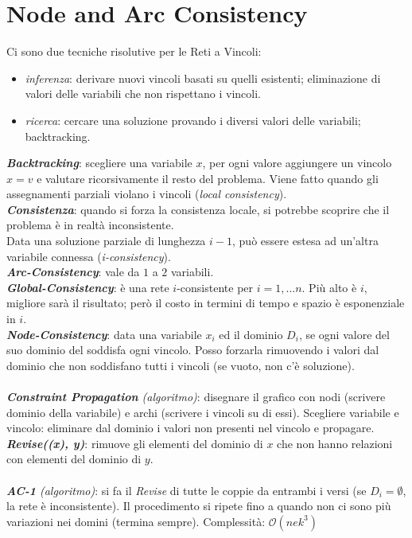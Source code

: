 \documentclass[a4paper, notitlepage, 9pt]{extreport}
\begin{document}
\chapter*{Node and Arc Consistency}
Ci sono due tecniche risolutive per le Reti a Vincoli:
\begin{itemize}
	\item \textit{inferenza}: derivare nuovi vincoli basati su quelli esistenti; eliminazione di valori delle variabili che non rispettano i vincoli.
	\item \textit{ricerca}: cercare una soluzione provando i diversi valori delle variabili; backtracking.
\end{itemize}
\textit{\textbf{Backtracking}}: scegliere una variabile $x$, per ogni valore aggiungere un vincolo $x=v$ e valutare ricorsivamente il resto del problema. Viene fatto quando gli assegnamenti parziali violano i vincoli (\textit{local consistency}).\\
\textit{\textbf{Consistenza}}: quando si forza la consistenza locale, si potrebbe scoprire che il problema è in realtà inconsistente.\\
Data una soluzione parziale di lunghezza $i-1$, può essere estesa ad un'altra variabile connessa (\textit{i-consistency}).\\
\textit{\textbf{Arc-Consistency}}: vale da $1$ a $2$ variabili.\\
\textit{\textbf{Global-Consistency}}: è una rete $i$-consistente per $i=1, \dots n$. Più alto è $i$, migliore sarà il risultato; però il costo in termini di tempo e spazio è esponenziale in $i$.\\
\textit{\textbf{Node-Consistency}}: data una variabile $x_i$ ed il dominio $D_i$, se ogni valore del suo dominio del soddisfa ogni vincolo. Posso forzarla rimuovendo i valori dal dominio che non soddisfano tutti i vincoli (se vuoto, non c'è soluzione).\\\\
\textit{\textbf{Constraint Propagation} (algoritmo)}: disegnare il grafico con nodi (scrivere dominio della variabile) e archi (scrivere i vincoli su di essi). Scegliere variabile e vincolo: eliminare dal dominio i valori non presenti nel vincolo e propagare.\\
\textit{\textbf{Revise((x), y)}}: rimuove gli elementi del dominio di $x$ che non hanno relazioni con elementi del dominio di $y$.\\\\
\textit{\textbf{AC-1} (algoritmo)}: si fa il \textit{Revise} di tutte le coppie da entrambi i versi (se $D_i=\emptyset$, la rete è inconsistente). Il procedimento si ripete fino a quando non ci sono più variazioni nei domini (termina sempre). Complessità: $\mathcal{O}(nek^3)$\\
\end{document}
